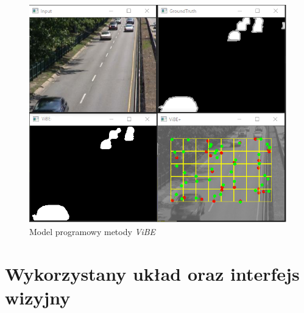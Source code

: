     \begin{figure}[h!]
        \centering
        \includegraphics[scale=0.55]{img/4/vibe_module_cpp.png}
        \caption{Model programowy metody \textit{ViBE}}
	    \label{fig:vibe_cpp}
    \end{figure}
    

\section{Wykorzystany układ oraz interfejs wizyjny}
\label{sec:uklad_interfejs}

